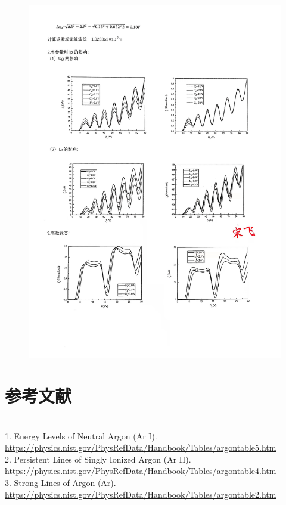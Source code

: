 \documentclass[UTF8]{ctexart}
\begin{document}
    \begin{figure}[H]\begin{center}
        \includegraphics[scale=0.25]{data2.jpg}
    \end{center}  \end{figure}
    \vspace{-4em}
\section{参考文献}\quad\\
1. Energy Levels of Neutral Argon (Ar I). \href{https://physics.nist.gov/PhysRefData/Handbook/Tables/argontable5.htm}{https://physics.nist.gov/PhysRefData/Handbook/Tables/argontable5.htm}\\
2. Persistent Lines of Singly Ionized Argon (Ar II). \href{https://physics.nist.gov/PhysRefData/Handbook/Tables/argontable4.htm}{https://physics.nist.gov/PhysRefData/Handbook/Tables/argontable4.htm}\\
3. Strong Lines of Argon (Ar). \href{https://physics.nist.gov/PhysRefData/Handbook/Tables/argontable2.htm}{https://physics.nist.gov/PhysRefData/Handbook/Tables/argontable2.htm}
\end{document}
